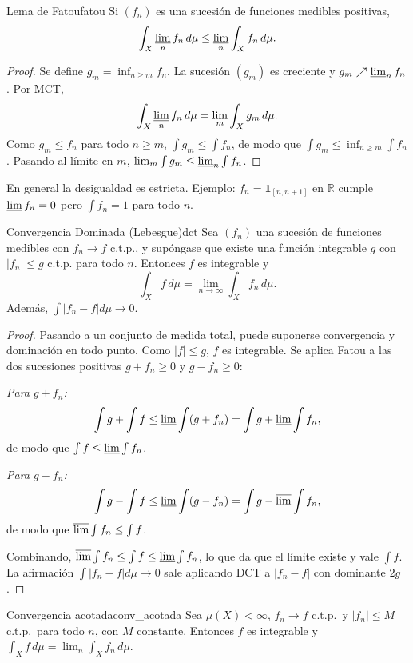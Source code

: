 \documentclass[11pt, a4paper]{article}
\begin{document}
\begin{teorema}{Lema de Fatou}{fatou}
Si $(f_n)$ es una sucesión de funciones medibles positivas,
$$ \int_X \varliminf_n f_n \, d\mu \le \varliminf_n \int_X f_n \, d\mu. $$
\end{teorema}

\begin{proof}
Se define $g_m = \inf_{n \ge m} f_n$. La sucesión $(g_m)$ es creciente y $g_m \nearrow
\varliminf_n f_n$. Por MCT,
$$ \int_X \varliminf_n f_n \, d\mu = \lim_m \int_X g_m \, d\mu. $$
Como $g_m \le f_n$ para todo $n \ge m$, $\int g_m \le \int f_n$, de modo que
$\int g_m \le \inf_{n \ge m} \int f_n$. Pasando al límite en $m$,
$\lim_m \int g_m \le \varliminf_n \int f_n$.
\end{proof}

\obs En general la desigualdad es estricta. Ejemplo: $f_n = \mathbf{1}_{[n, n+1]}$ en $\mathbb{R}$
cumple $\varliminf f_n = 0$ pero $\int f_n = 1$ para todo $n$.

\begin{teorema}{Convergencia Dominada (Lebesgue)}{dct}
Sea $(f_n)$ una sucesión de funciones medibles con $f_n \to f$ c.t.p., y supóngase que existe
una función integrable $g$ con $|f_n| \le g$ c.t.p. para todo $n$. Entonces $f$ es integrable y
$$ \int_X f \, d\mu = \lim_{n \to \infty} \int_X f_n \, d\mu. $$
Además, $\int |f_n - f| d\mu \to 0$.
\end{teorema}

\begin{proof}
Pasando a un conjunto de medida total, puede suponerse convergencia y dominación en todo punto.
Como $|f| \le g$, $f$ es integrable. Se aplica Fatou a las dos sucesiones positivas
$g + f_n \ge 0$ y $g - f_n \ge 0$:

\textit{Para $g + f_n$:}
$$ \int g + \int f \le \varliminf \int (g + f_n) = \int g + \varliminf \int f_n, $$
de modo que $\int f \le \varliminf \int f_n$.

\textit{Para $g - f_n$:}
$$ \int g - \int f \le \varliminf \int (g - f_n) = \int g - \varlimsup \int f_n, $$
de modo que $\varlimsup \int f_n \le \int f$.

Combinando, $\varlimsup \int f_n \le \int f \le \varliminf \int f_n$, lo que da que el límite
existe y vale $\int f$. La afirmación $\int|f_n - f| d\mu \to 0$ sale aplicando DCT a
$|f_n - f|$ con dominante $2g$.
\end{proof}

\begin{corolario}{Convergencia acotada}{conv_acotada}
Sea $\mu(X) < \infty$, $f_n \to f$ c.t.p.\ y $|f_n| \le M$ c.t.p.\ para todo $n$, con $M$
constante. Entonces $f$ es integrable y $\int_X f \, d\mu = \lim_n \int_X f_n \, d\mu$.
\end{corolario}
\end{document}
